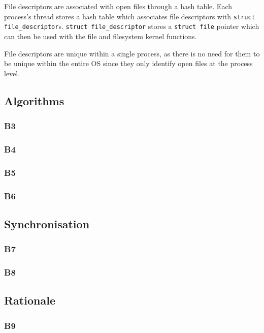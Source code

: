 \documentclass[a4wide, 11pt]{article}
\newcommand{\tx}{\texttt}
\begin{document}
File descriptors are associated with open files through a hash table. Each process's thread stores a hash table which associates file descriptors with \tx{struct file\_descriptor}s. \tx{struct file\_descriptor} stores a \tx{struct file} pointer which can then be used with the file and filesystem kernel functions.

File descriptors are unique within a single process, as there is no need for them to be unique within the entire OS since they only identify open files at the process level.

\subsection{Algorithms}
\subsubsection{B3}

\subsubsection{B4}

\subsubsection{B5}

\subsubsection{B6}

\subsection{Synchronisation}
\subsubsection{B7}

\subsubsection{B8}

\subsection{Rationale}
\subsubsection{B9}
\end{document}
